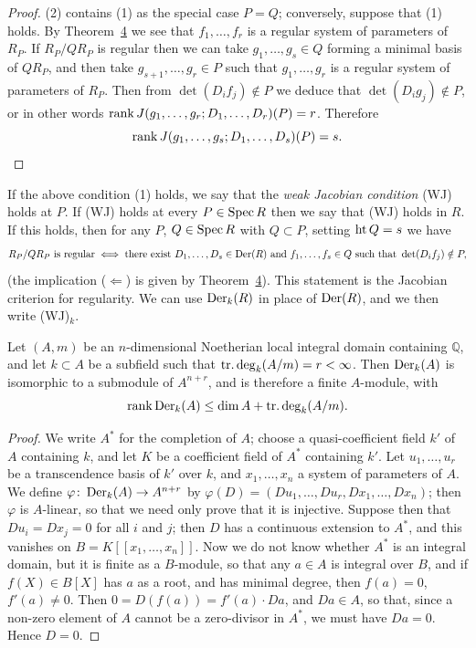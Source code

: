 \begin{proof}
(2) contains (1) as the special case $P = Q$; conversely, suppose that (1) holds.
By Theorem~\hyperref[thm:30.4]{4} we see that $f_1, \ldots, f_r$ is a regular system of parameters
of $R_P$. If $R_P/QR_P$ is regular then we can take $g_1, \ldots, g_s \in Q$ forming a
minimal basis of $QR_P$, and then take $g_{s+1}, \ldots, g_r \in P$ such that
$g_1, \ldots, g_r$ is a regular system of parameters of $R_P$. Then from
$\det(D_if_j) \notin P$ we deduce that $\det(D_ig_j) \notin P$, or in other words
$\operatorname{rank} J(g_1, \ldots, g_r; D_1, \ldots, D_r)(P) = r$. Therefore
\[
  \operatorname{rank} J(g_1, \ldots, g_s; D_1, \ldots, D_s)(P) = s.
\]
\end{proof}

If the above condition (1) holds, we say that the \emph{weak Jacobian condition} (WJ)
holds at $P$. If (WJ) holds at every $P \in \operatorname{Spec} R$ then we say that (WJ) holds in $R$.
If this holds, then for any $P$, $Q \in \operatorname{Spec} R$ with $Q \subset P$, setting $\operatorname{ht} Q = s$ we
have
\[
  R_P/QR_P \text{ is regular} \iff
  \text{there exist } D_1, \ldots, D_s \in \operatorname{Der}(R) \text{ and }
  f_1, \ldots, f_s \in Q \text{ such that } \det(D_if_j) \notin P,
\]
(the implication ($\Leftarrow$) is given by Theorem~\hyperref[thm:30.4]{4}). This statement is
the Jacobian criterion for regularity. We can use $\operatorname{Der}_k(R)$ in place of
$\operatorname{Der}(R)$, and we then write (WJ)$_k$.

\begin{theorem}\label{thm:30.7}
Let $(A, m)$ be an $n$-dimensional Noetherian local integral domain containing
$\mathbb{Q}$, and let $k \subset A$ be a subfield such that $\operatorname{tr.deg}_k(A/m) = r < \infty$. Then
$\operatorname{Der}_k(A)$ is isomorphic to a submodule of $A^{n+r}$, and is therefore a finite
$A$-module, with
\[
  \operatorname{rank} \operatorname{Der}_k(A) \le \dim A + \operatorname{tr.deg}_k(A/m).
\]
\end{theorem}

\begin{proof}
We write $A^*$ for the completion of $A$; choose a quasi-coefficient field $k'$ of $A$
containing $k$, and let $K$ be a coefficient field of $A^*$ containing $k'$. Let
$u_1, \ldots, u_r$ be a transcendence basis of $k'$ over $k$, and $x_1, \ldots, x_n$ a system
of parameters of $A$. We define $\varphi\colon \operatorname{Der}_k(A) \to A^{n+r}$ by
$\varphi(D) = (Du_1, \ldots, Du_r, Dx_1, \ldots, Dx_n)$; then $\varphi$ is $A$-linear, so that we
need only prove that it is injective. Suppose then that $Du_i = Dx_j = 0$ for all $i$
and $j$; then $D$ has a continuous extension to $A^*$, and this vanishes on
$B = K[[x_1, \ldots, x_n]]$. Now we do not know whether $A^*$ is an integral domain,
but it is finite as a $B$-module, so that any $a \in A$ is integral over $B$, and if
$f(X) \in B[X]$ has $a$ as a root, and has minimal degree, then $f(a) = 0$,
$f'(a) \ne 0$. Then $0 = D(f(a)) = f'(a) \cdot Da$, and $Da \in A$, so that, since a
non-zero element of $A$ cannot be a zero-divisor in $A^*$, we must have $Da = 0$.
Hence $D = 0$.
\end{proof}

